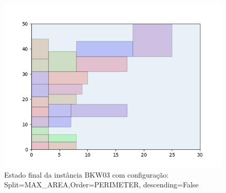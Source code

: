 \begin{figure}[H]
    \centering
    \caption[]{Estado final da instância BKW03 com configuração: Split=MAX_AREA,Order=PERIMETER, descending=False}
    \label{fig:bkw03-max_area-perimeter-false}
    \includegraphics[scale=0.5]{output/figures/bkw/bkw03/max_area/perimeter/false/00}
\end{figure}